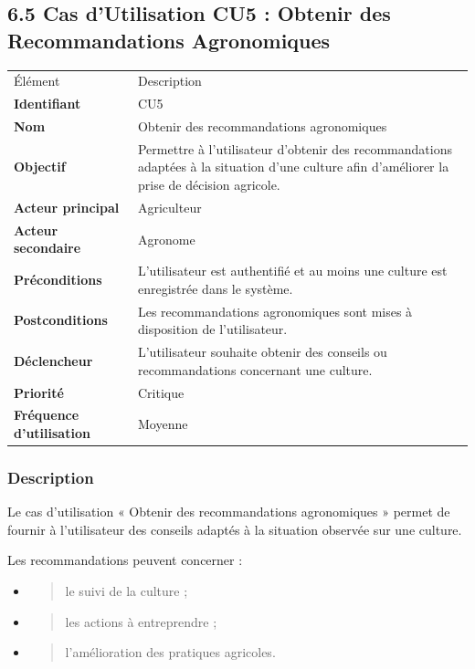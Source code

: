 \documentclass[
]{article}
\begin{document}
\hypertarget{cas-dutilisation-cu5-obtenir-des-recommandations-agronomiques}{%
\subsection{6.5 Cas d'Utilisation CU5 : Obtenir des Recommandations
Agronomiques}\label{cas-dutilisation-cu5-obtenir-des-recommandations-agronomiques}}

\begin{longtable}[]{@{}ll@{}}
\toprule
\endhead
Élément & Description \\
\textbf{Identifiant} & CU5 \\
\textbf{Nom} & Obtenir des recommandations agronomiques \\
\textbf{Objectif} & Permettre à l'utilisateur d'obtenir des
recommandations adaptées à la situation d'une culture afin d'améliorer
la prise de décision agricole. \\
\textbf{Acteur principal} & Agriculteur \\
\textbf{Acteur secondaire} & Agronome \\
\textbf{Préconditions} & L'utilisateur est authentifié et au moins une
culture est enregistrée dans le système. \\
\textbf{Postconditions} & Les recommandations agronomiques sont mises à
disposition de l'utilisateur. \\
\textbf{Déclencheur} & L'utilisateur souhaite obtenir des conseils ou
recommandations concernant une culture. \\
\textbf{Priorité} & Critique \\
\textbf{Fréquence d'utilisation} & Moyenne \\
\bottomrule
\end{longtable}

\hypertarget{description-3}{%
\subsubsection{Description}\label{description-3}}

Le cas d'utilisation « Obtenir des recommandations agronomiques » permet
de fournir à l'utilisateur des conseils adaptés à la situation observée
sur une culture.

Les recommandations peuvent concerner :

\begin{itemize}
\item
  \begin{quote}
  le suivi de la culture ;
  \end{quote}
\item
  \begin{quote}
  les actions à entreprendre ;
  \end{quote}
\item
  \begin{quote}
  l'amélioration des pratiques agricoles.
  \end{quote}
\end{itemize}
\end{document}
